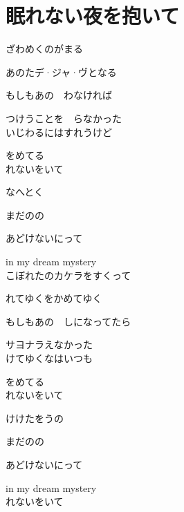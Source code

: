 \section{ 眠れない夜を抱いて}
\large{

ざわめくのがまる

あのたデ·ジャ·ヴとなる

もしもあの　わなければ

つけうことを　らなかった
\\

いじわるにはすれうけど

をめてる
\\

れないをいて

なへとく

まだのの

あどけないにって

in my dream mystery
\\

こぼれたのカケラをすくって

れてゆくをかめてゆく

もしもあの　しになってたら

サヨナラえなかった
\\

けてゆくなはいつも

をめてる
\\

れないをいて

けけたをうの

まだのの

あどけないにって

in my dream mystery
\\

れないをいて

}
